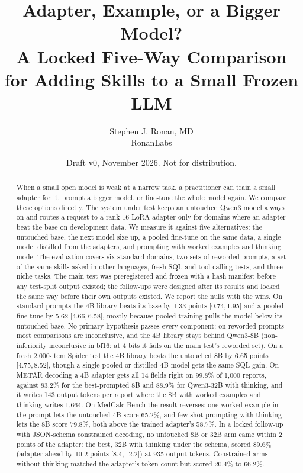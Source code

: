 \documentclass[11pt]{article}
\title{Adapter, Example, or a Bigger Model?\\
A Locked Five-Way Comparison for Adding Skills to a Small Frozen LLM}
\author{Stephen J. Ronan, MD\\RonanLabs}
\date{Draft v0, November 2026. Not for distribution.}
\newcommand{\ci}[2]{[#1,\allowbreak\,#2]}
\begin{document}
\maketitle

\begin{abstract}
When a small open model is weak at a narrow task, a practitioner can train a small adapter for it, prompt a bigger
model, or fine-tune the whole model again. We compare these options directly. The system under test keeps an
untouched Qwen3 model always on and routes a request to a rank-16 LoRA adapter only for domains where an adapter beat
the base on development data. We measure it against five alternatives: the untouched base, the next model size up, a
pooled fine-tune on the same data, a single model distilled from the adapters, and prompting with worked examples and
thinking mode. The evaluation covers six standard domains, two sets of reworded prompts, a set of the same skills
asked in other languages, fresh SQL and tool-calling tests, and three niche tasks. The main test was preregistered
and frozen with a hash manifest before any test-split output existed; the follow-ups were designed after its results
and locked the same way before their own outputs existed. We report the nulls with the wins. On standard prompts the
4B library beats its base by 1.33 points \ci{0.74}{1.95} and a pooled fine-tune by 5.62 \ci{4.66}{6.58}, mostly because
pooled training pulls the model below its untouched base. No primary hypothesis passes every component: on reworded
prompts most comparisons are inconclusive, and the 4B library stays behind Qwen3-8B (non-inferiority inconclusive in
bf16; at 4 bits it fails on the main test's reworded set).
On a fresh 2,000-item Spider test the 4B library beats the untouched 8B by 6.65 points \ci{4.75}{8.52}, though a
single pooled or distilled 4B model gets the same SQL gain. On METAR decoding a 4B adapter gets all 14 fields right on
99.8\% of 1,000 reports, against 83.2\% for the best-prompted 8B and 88.9\% for Qwen3-32B with thinking, and it
writes 143 output tokens per report where the 8B with worked examples and thinking writes 1,664. On MedCalc-Bench the result reverses:
one worked example in the prompt lets the untouched 4B score 65.2\%, and few-shot prompting with thinking lets the
8B score 79.8\%, both above the trained adapter's 58.7\%. In a locked follow-up with JSON-schema constrained decoding, no
untouched 8B or 32B arm came within 2 points of the adapter: the best, 32B with thinking under the schema, scored
89.6\% (adapter ahead by 10.2 points \ci{8.4}{12.2}) at 935 output tokens. Constrained arms without thinking matched
the adapter's token count but scored 20.4\% to 66.2\%.
\end{abstract}
\end{document}
